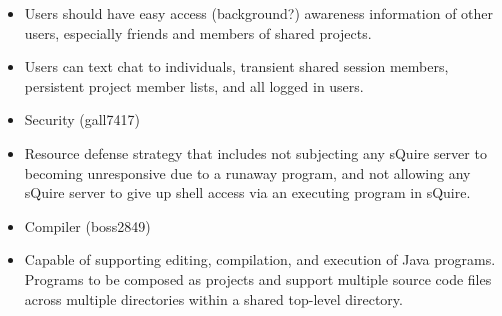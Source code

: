 \documentclass[11pt]{report}
\begin{document}
\begin{itemize}
            \item Users should have easy access (background?) awareness information of other users, especially friends and members of shared projects.
            \item Users can text chat to individuals, transient shared session members, persistent project member lists, and all logged in users.
        \item Security (gall7417)
            \item Resource defense strategy that includes not subjecting any sQuire server to becoming unresponsive due to a runaway program, and not allowing any sQuire server to give up shell access via an executing program in sQuire.
        \item Compiler (boss2849)
            \item Capable of supporting editing, compilation, and execution of Java programs. Programs to be composed as projects and support multiple source code files across multiple directories within a shared top-level directory.

    \end{itemize}
    
\end{document}
